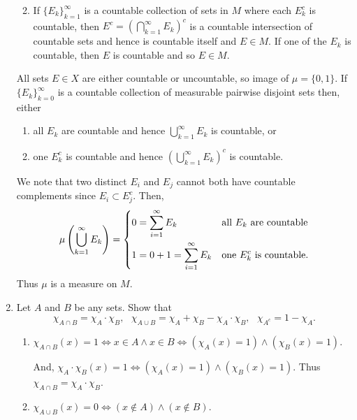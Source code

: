 \documentclass[12pt]{article}
\begin{document}
\begin{enumerate}
\begin{mybox}
\begin{enumerate}
      \vspace*{1mm}
    \item If $\{E_k\}_{k=1}^\infty$ is a countable collection
      of sets in $M$ where each $E_k^c$ is countable, then
      $E^c=\left(\bigcap_{k=1}^\infty{E_k}\right)^c$ is a countable intersection
      of countable sets and hence is countable itself and
      $E\in M$. If one of the $E_k$ is countable, then $E$ is
      countable and so $E\in M$.
  \end{enumerate}
  All sets $E\in X$ are either countable or uncountable,
  so image of $\mu=\{0,1\}$. If $\{E_k\}_{k=0}^\infty$ is a
  countable collection of measurable pairwise disjoint
  sets then, either

  \vspace*{2mm}
  \begin{enumerate}
    \item all $E_k$ are countable and hence
    $\bigcup_{k=1}^\infty{E_k}$ is countable, or
    \item one $E_k^c$ is countable and hence
    $\left(\bigcup_{k=1}^\infty{E_k}\right)^c$ is
    countable.
  \end{enumerate}

  We note that two distinct $E_i$ and $E_j$ cannot both
  have countable complements since $E_i\subset E_j^c$.
  Then,
  $$\mu\left(\bigcup_{k=1}^\infty{E_k}\right)=
  \begin{dcases}
    0=\sum_{i=1}^\infty{E_k} &\text{all $E_k$ are countable}\\
    1=0+1=\sum_{i=1}^\infty{E_k}&\text{one $E_k^c$ is countable.}
  \end{dcases}
  $$
  Thus $\mu$ is a measure on $M$.
\end{mybox}

\item Let $A$ and $B$ be any sets. Show that
$$\chi_{A\cap B} = \chi_A\cdot\chi_B,\ \ \
\chi_{A\cup B} = \chi_A + \chi_B - \chi_A\cdot\chi_B,\ \ \
\chi_{A^c}=1-\chi_A.$$
\begin{mybox}
  \begin{enumerate}
    \item $\chi_{A\cap B}(x)=1\iff x\in A\wedge x\in B\iff
    (\chi_A(x)=1)\wedge (\chi_B(x)=1).$
  
    And, $\chi_A\cdot\chi_B(x)=1\iff
    (\chi_A(x)=1)\wedge (\chi_B(x)=1).$ Thus
    $\chi_{A\cap B} = \chi_A\cdot\chi_B$.

    \vspace*{3mm}
    \item $\chi_{A\cup B}(x)=0\iff (x\notin A)\wedge
    (x\notin B)$.


\end{enumerate}
\end{mybox}
\end{enumerate}
\end{document}
